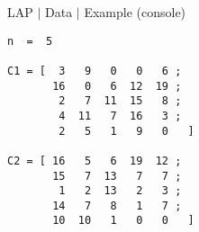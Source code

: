 %
% 
\begin{frame}[fragile=singleslide]{LAP $\mid$ Data $\mid$ Example (console)}

{\small
\begin{verbatim}
n  =  5

C1 = [  3   9   0   0   6 ;
       16   0   6  12  19 ;
        2   7  11  15   8 ;
        4  11   7  16   3 ;
        2   5   1   9   0   ]

C2 = [ 16   5   6  19  12 ;
       15   7  13   7   7 ;
        1   2  13   2   3 ;
       14   7   8   1   7 ;
       10  10   1   0   0   ]
\end{verbatim}
}

\end{frame}

%
% 
